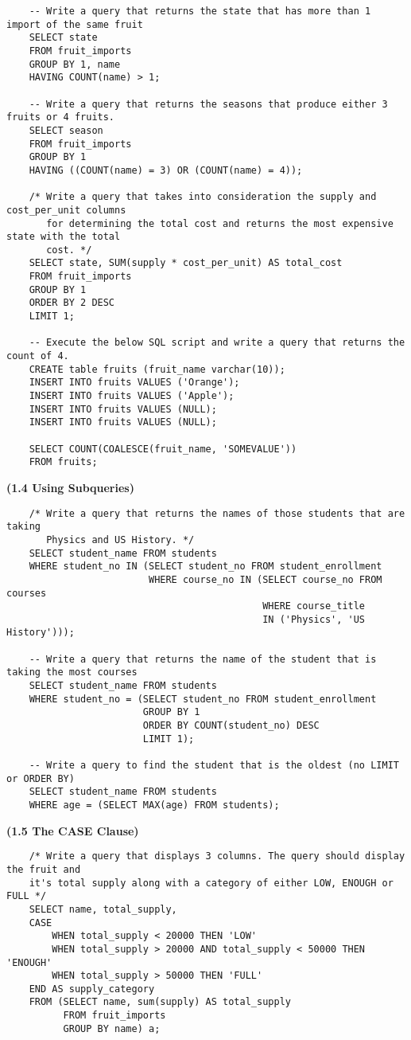 \documentclass[11pt, a4paper]{article}
\begin{document}
\begin{spacing}{1.1}
\begin{lstlisting}
	-- Write a query that returns the state that has more than 1 import of the same fruit
	SELECT state
	FROM fruit_imports
	GROUP BY 1, name
	HAVING COUNT(name) > 1;
	
	-- Write a query that returns the seasons that produce either 3 fruits or 4 fruits.
	SELECT season
	FROM fruit_imports
	GROUP BY 1
	HAVING ((COUNT(name) = 3) OR (COUNT(name) = 4));
	
	/* Write a query that takes into consideration the supply and cost_per_unit columns 
	   for determining the total cost and returns the most expensive state with the total 
	   cost. */
	SELECT state, SUM(supply * cost_per_unit) AS total_cost
	FROM fruit_imports
	GROUP BY 1
	ORDER BY 2 DESC
	LIMIT 1;
	
	-- Execute the below SQL script and write a query that returns the count of 4.	
	CREATE table fruits (fruit_name varchar(10));
	INSERT INTO fruits VALUES ('Orange');
	INSERT INTO fruits VALUES ('Apple');
	INSERT INTO fruits VALUES (NULL);
	INSERT INTO fruits VALUES (NULL);
	
	SELECT COUNT(COALESCE(fruit_name, 'SOMEVALUE'))
	FROM fruits; \end{lstlisting} \newpage
	\noindent \large \textbf{(1.4 Using Subqueries)} \normalsize
	\begin{lstlisting}
	/* Write a query that returns the names of those students that are taking 
	   Physics and US History. */
	SELECT student_name FROM students
	WHERE student_no IN (SELECT student_no FROM student_enrollment 
	                     WHERE course_no IN (SELECT course_no FROM courses 
	                                         WHERE course_title 
	                                         IN ('Physics', 'US History')));
	
	-- Write a query that returns the name of the student that is taking the most courses
	SELECT student_name FROM students
	WHERE student_no = (SELECT student_no FROM student_enrollment
	                    GROUP BY 1
	                    ORDER BY COUNT(student_no) DESC
	                    LIMIT 1); 
	
	-- Write a query to find the student that is the oldest (no LIMIT or ORDER BY)
	SELECT student_name FROM students
	WHERE age = (SELECT MAX(age) FROM students); \end{lstlisting} \vspace*{5mm}

	\noindent \large \textbf{(1.5 The CASE Clause)} \normalsize
	\begin{lstlisting}
	/* Write a query that displays 3 columns. The query should display the fruit and 
	it's total supply along with a category of either LOW, ENOUGH or FULL */
	SELECT name, total_supply,
	CASE
		WHEN total_supply < 20000 THEN 'LOW'
		WHEN total_supply > 20000 AND total_supply < 50000 THEN 'ENOUGH'
		WHEN total_supply > 50000 THEN 'FULL'
	END AS supply_category
	FROM (SELECT name, sum(supply) AS total_supply 
		  FROM fruit_imports 
		  GROUP BY name) a;
	

\end{lstlisting}
\end{spacing}
\end{document}
